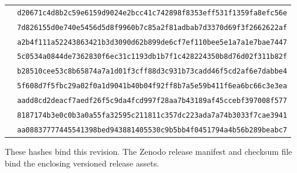 \documentclass[10pt]{article}
\newcommand{\sha}[1]{\nolinkurl{#1}}
\begin{document}
\begin{longtable}{L{.55\linewidth}L{.39\linewidth}}
& \sha{d20671c4d8b2c59e6159d9024e2bcc41c742898f8353eff531f1359fa8efc56e}\\
& \sha{7d826155d0e740e5456d5d8f9960b7c85a2f81adbab7d3370d69f3f2662622af}\\
& \sha{a2b4f111a52243863421b3d3090d62b899de6cf7ef110bee5e1a7a1e7bae7447}\\
& \sha{5c0534a0844de7362830f6ec31c1193db1b7f1c428224350b8d76d02f311b82f}\\
& \sha{b28510cee53c8b65874a7a1d01f3cff88d3c931b73cadd46f5cd2af6e7dabbe4}\\
& \sha{5f608d7f5fbc29a02f0a1d9041b40b04f92ff8b7a5e59b411f6ea6bc66c3e3ea}\\
& \sha{aadd8cd2deacf7aedf26f5c9da4fcd997f28aa7b43189af45ccebf397008f577}\\
& \sha{8187174b3e0c0b3a0a55fa32595c211811c357dc223ada7a74b3033f7cae3941}\\
& \sha{aa08837777445541398bed943881405530c9b5bb4f0451794a4b56b289beabc7}\\
\bottomrule
\end{longtable}
\endgroup

These hashes bind this revision.  The Zenodo release manifest and checksum
file bind the enclosing versioned release assets.
\end{document}
